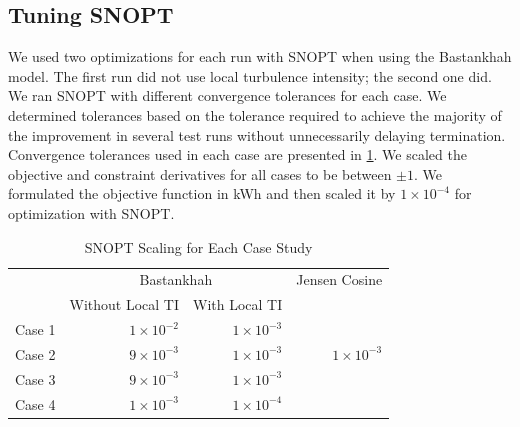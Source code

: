 \documentclass{jpconf}
\begin{document}
\subsection{Tuning SNOPT}
We used two optimizations for each run with SNOPT when using the Bastankhah model. The first run did not use local turbulence intensity; the second one did. We ran SNOPT with different convergence tolerances for each case. We determined tolerances based on the tolerance required to achieve the majority of the improvement in several test runs without unnecessarily delaying termination. Convergence tolerances used in each case are presented in \cref{tab:snopttols}. We scaled the objective and constraint derivatives for all cases to be between $\pm1$. We formulated the objective function in kWh and then scaled it by $1\times10^{-4}$ for optimization with SNOPT.
%
\begin{table}[h!]
	\centering
	\caption{SNOPT Scaling for Each Case Study}
	\label{tab:snopttols}
	\begin{tabular}{lrrr}
		\toprule
		{} & \multicolumn{2}{c}{Bastankhah } & Jensen Cosine \\
		\cmidrule(lr){2-3} \cmidrule(lr){4-4}
		 & Without Local TI & With Local TI &  \\
		\cmidrule(lr){2-3} 
		Case 1 &  $1\times10^{-2}$ & $1\times10^{-3}$ & \\
		Case 2 & $9\times10^{-3}$ & $1\times10^{-3}$ & $1\times10^{-3}$ \\
		Case 3 & $9\times10^{-3}$ & $1\times10^{-3}$ & \\
		Case 4 &  $1\times10^{-3}$ & $1\times10^{-4}$ &  \\
		\bottomrule
	\end{tabular}
\end{table}
\end{document}
